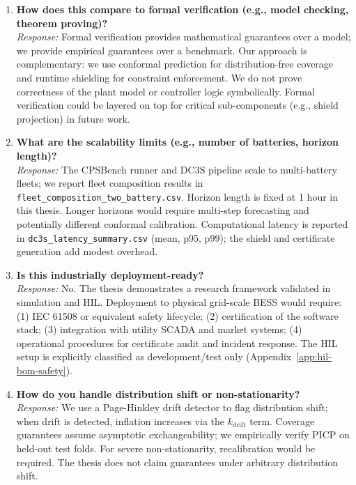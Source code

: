 \begin{enumerate}
\item \textbf{How does this compare to formal verification (e.g., model checking, theorem proving)?} \\
\textit{Response:} Formal verification provides mathematical guarantees over a model; we provide empirical guarantees over a benchmark. Our approach is complementary: we use conformal prediction for distribution-free coverage and runtime shielding for constraint enforcement. We do not prove correctness of the plant model or controller logic symbolically. Formal verification could be layered on top for critical sub-components (e.g., shield projection) in future work.

\item \textbf{What are the scalability limits (e.g., number of batteries, horizon length)?} \\
\textit{Response:} The CPSBench runner and DC3S pipeline scale to multi-battery fleets; we report fleet composition results in \texttt{fleet\_composition\_two\_battery.csv}. Horizon length is fixed at 1 hour in this thesis. Longer horizons would require multi-step forecasting and potentially different conformal calibration. Computational latency is reported in \texttt{dc3s\_latency\_summary.csv} (mean, p95, p99); the shield and certificate generation add modest overhead.

\item \textbf{Is this industrially deployment-ready?} \\
\textit{Response:} No. The thesis demonstrates a research framework validated in simulation and HIL. Deployment to physical grid-scale BESS would require: (1) IEC 61508 or equivalent safety lifecycle; (2) certification of the software stack; (3) integration with utility SCADA and market systems; (4) operational procedures for certificate audit and incident response. The HIL setup is explicitly classified as development/test only (Appendix~\ref{app:hil-bom-safety}).

\item \textbf{How do you handle distribution shift or non-stationarity?} \\
\textit{Response:} We use a Page-Hinkley drift detector to flag distribution shift; when drift is detected, inflation increases via the $k_{\text{drift}}$ term. Coverage guarantees assume asymptotic exchangeability; we empirically verify PICP on held-out test folds. For severe non-stationarity, recalibration would be required. The thesis does not claim guarantees under arbitrary distribution shift.


\end{enumerate}
